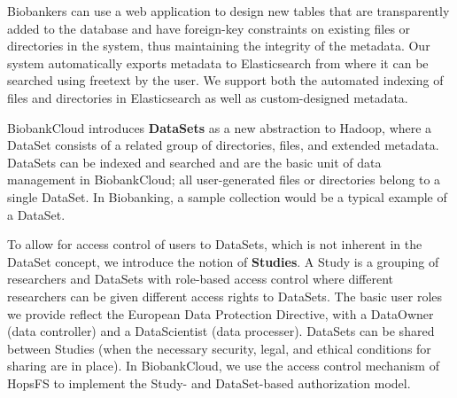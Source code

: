 Biobankers can use a web application to design new tables that are transparently added to the database and have foreign-key constraints on existing files or directories in the system, thus maintaining the integrity of the metadata. Our system automatically exports metadata to Elasticsearch from where it can be searched using freetext by the user. We support both the automated indexing of files and directories in Elasticsearch as well as custom-designed metadata.

BiobankCloud introduces \textbf{DataSets} as a new abstraction to Hadoop, where a DataSet consists of a related group of directories, files, and extended metadata. DataSets can be indexed and searched and are the basic unit of data management in BiobankCloud; all user-generated files or directories belong to a single DataSet. In Biobanking, a sample collection would be a typical example of a DataSet. 

To allow for access control of users to DataSets, which is not inherent in the DataSet concept, we introduce the notion of \textbf{Studies}. A Study is a grouping of researchers and DataSets with role-based access control where different researchers can be given different access rights to DataSets. The basic user roles we provide reflect the European Data Protection Directive, with a DataOwner (data controller) and a DataScientist (data processer). DataSets can be shared between Studies (when the necessary security, legal, and ethical conditions for sharing are in place).  In BiobankCloud, we use the access control mechanism of HopsFS to implement the Study- and DataSet-based authorization model. 
